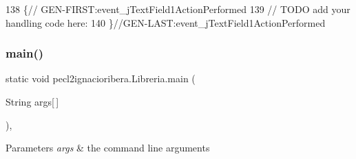 \begin{DoxyCode}
138                                                                             \{\textcolor{comment}{//
      GEN-FIRST:event\_jTextField1ActionPerformed}
139         \textcolor{comment}{// TODO add your handling code here:}
140     \}\textcolor{comment}{//GEN-LAST:event\_jTextField1ActionPerformed}
\end{DoxyCode}
\mbox{\label{classpecl2ignacioribera_1_1_libreria_aa1ad2e8aa0d79bee9ab29d4c49cd9a64}} 
\subsubsection{\texorpdfstring{main()}{main()}}
{\footnotesize\ttfamily static void pecl2ignacioribera.\+Libreria.\+main (\begin{DoxyParamCaption}\item[{String}]{args\mbox{[}$\,$\mbox{]} }\end{DoxyParamCaption})\hspace{0.3cm}{\ttfamily [inline]}, {\ttfamily [static]}}


\begin{DoxyParams}{Parameters}
{\em args} & the command line arguments \\
\hline
\end{DoxyParams}

